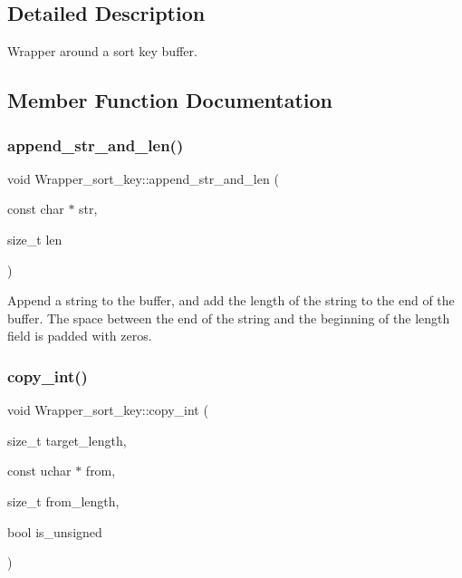 \subsection{Detailed Description}
Wrapper around a sort key buffer. 

\subsection{Member Function Documentation}
\mbox{\label{classWrapper__sort__key_a0c56a83c72d63abf2c6bded0f2d62e11}} 
\subsubsection{\texorpdfstring{append\+\_\+str\+\_\+and\+\_\+len()}{append\_str\_and\_len()}}
{\footnotesize\ttfamily void Wrapper\+\_\+sort\+\_\+key\+::append\+\_\+str\+\_\+and\+\_\+len (\begin{DoxyParamCaption}\item[{const char $\ast$}]{str,  }\item[{size\+\_\+t}]{len }\end{DoxyParamCaption})\hspace{0.3cm}{\ttfamily [inline]}}

Append a string to the buffer, and add the length of the string to the end of the buffer. The space between the end of the string and the beginning of the length field is padded with zeros. \mbox{\label{classWrapper__sort__key_ac22304eb125f9784d9d133a5a99be48b}} 
\subsubsection{\texorpdfstring{copy\+\_\+int()}{copy\_int()}}
{\footnotesize\ttfamily void Wrapper\+\_\+sort\+\_\+key\+::copy\+\_\+int (\begin{DoxyParamCaption}\item[{size\+\_\+t}]{target\+\_\+length,  }\item[{const uchar $\ast$}]{from,  }\item[{size\+\_\+t}]{from\+\_\+length,  }\item[{bool}]{is\+\_\+unsigned }\end{DoxyParamCaption})\hspace{0.3cm}{\ttfamily [inline]}}


